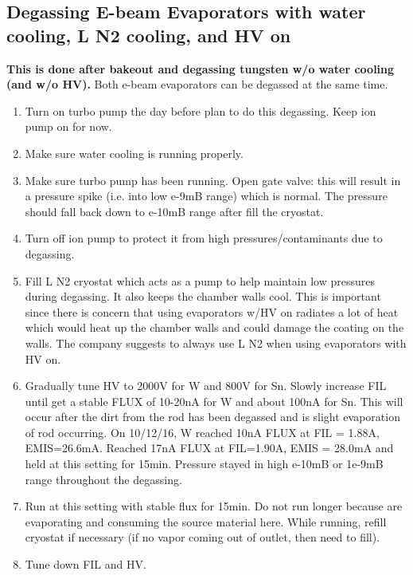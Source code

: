 \subsection{Degassing E-beam Evaporators with water cooling, L N2 cooling, and HV on}
\textbf{This is done after bakeout and degassing tungsten w/o water cooling (and w/o HV).}
Both e-beam evaporators can be degassed at the same time.
\begin{enumerate}
\item	Turn on turbo pump the day before plan to do this degassing. Keep ion pump on for now.
\item	Make sure water cooling is running properly.
\item	Make sure turbo pump has been running. Open gate valve: this will result in a pressure spike (i.e. into low e-9mB range) which is normal. The pressure should fall back down to e-10mB range after fill the cryostat. 
\item	Turn off ion pump to protect it from high pressures/contaminants due to degassing.
\item	Fill L N2 cryostat which acts as a pump to help maintain low pressures during degassing. It also keeps the chamber walls cool. This is important since there is concern that using evaporators w/HV on radiates a lot of heat which would heat up the chamber walls and could damage the coating on the walls. The company suggests to always use L N2 when using evaporators with HV on.
\item	Gradually tune HV to 2000V for W and 800V for Sn. Slowly increase FIL until get a stable FLUX of 10-20nA for W and about 100nA for Sn. This will occur after the dirt from the rod has been degassed and is slight evaporation of rod occurring. 
On 10/12/16, W reached 10nA FLUX at FIL = 1.88A, EMIS=26.6mA. Reached 17nA FLUX at FIL=1.90A, EMIS = 28.0mA and held at this setting for 15min. Pressure stayed in high e-10mB or 1e-9mB range throughout the degassing.
\item	Run at this setting with stable flux for 15min. Do not run longer because are evaporating and consuming the source material here. While running, refill cryostat if necessary (if no vapor coming out of outlet, then need to fill).
\item	Tune down FIL and HV.
\end{enumerate}

